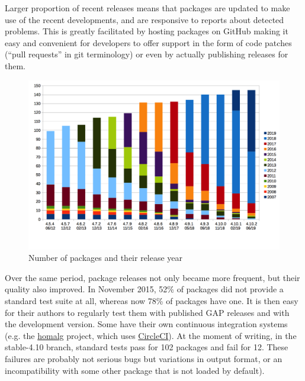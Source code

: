 Larger proportion of recent releases means that 
packages are updated to make use of the recent \GAP developments,
and are responsive to reports about detected problems.
This is greatly facilitated by hosting packages on GitHub making it
easy and convenient for \GAP developers to offer support in the form
of code patches (``pull requests'' in git terminology) or even by
actually publishing releases for them.

\begin{figure}[!ht]
    \centering
    \includegraphics[width=\textwidth]{images/gap-package-releases}
    \caption{Number of \GAP packages and their release year}
    \label{fig:gap-package-releases}
\end{figure}


Over the same period, package releases not only became more frequent,
but their quality also 
improved. In November 2015, 52\% of packages did not provide a standard 
test suite at all, whereas now 78\% of packages have one.
It is then easy for their authors to  regularly test them 
with published GAP releases and with the development version.
Some have their own continuous integration systems
(e.g. the \href{https://homalg-project.github.io/}{\sf homalg} project,
which uses \href{https://circleci.com/}{CircleCI}).
At the moment of writing, in the stable-4.10 branch,
standard tests pass for 102 packages
and fail for 12.
These failures are probably not serious bugs but variations in output
format, or an incompatibility with some other package
that is not loaded by default).

